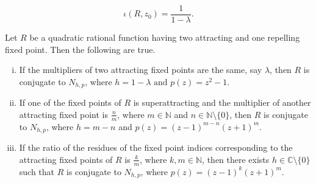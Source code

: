 \documentclass[10pt,a4paper]{amsart}
\begin{document}
\begin{equation}\label{FPI_simple}
\iota (R,z_0)=\frac{1}{1-\lambda}.
\end{equation}

\begin{lem}
Let $R$ be a quadratic rational function having two attracting and one repelling fixed point. Then the following are true.
\begin{enumerate}[(i)]
\item If the multipliers of two attracting fixed points are the same, say $\lambda$, then $R$ is conjugate to $N_{h, p}$, where
$
h=1-\lambda \text { and } p(z)=z^{2}-1
$.
\item If one of the fixed points of $R$ is superattracting and the multiplier of another attracting fixed point is $\frac{n}{m}$, where $m\in \mathbb{N}$ and $n \in \mathbb{N}\setminus \{0\}$, then $R$ is conjugate to $N_{h, p}$, where $h=m-n$ and $p(z)=(z-1)^{m-n}(z+1)^{m}$.
\item If the ratio of the residues of the fixed point indices corresponding to the attracting fixed points of $R$ is $\frac{k}{m}$, where $k,m\in \mathbb{N}$, then there exists $h\in \mathbb{C}\setminus \{0\}$ such that $R$ is conjugate to $N_{h, p}$, where $p(z)=(z-1)^{k}(z+1)^{m}$.
 \end{enumerate}
\end{lem}
\end{document}
